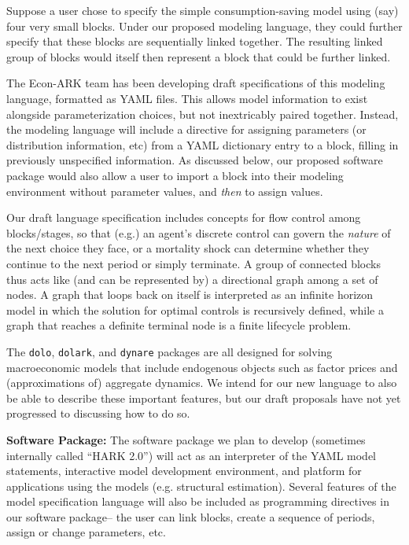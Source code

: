 \documentclass[12pt,pdftex,letterpaper]{article}
\begin{document}
Suppose a user chose to specify the simple consumption-saving model using (say) four very small blocks. Under our proposed modeling language, they could further specify that these blocks are sequentially linked together. The resulting linked group of blocks would itself then represent a block that could be further linked.

The Econ-ARK team has been developing draft specifications of this modeling language, formatted as YAML files. This allows model information to exist alongside parameterization choices, but not inextricably paired together. Instead, the modeling language will include a directive for assigning parameters (or distribution information, etc) from a YAML dictionary entry to a block, filling in previously unspecified information. As discussed below, our proposed software package would also allow a user to import a block into their modeling environment without parameter values, and \textit{then} to assign values.

Our draft language specification includes concepts for flow control among blocks/stages, so that (e.g.) an agent's discrete control can govern the \textit{nature} of the next choice they face, or a mortality shock can determine whether they continue to the next period or simply terminate. A group of connected blocks thus acts like (and can be represented by) a directional graph among a set of nodes. A graph that loops back on itself is interpreted as an infinite horizon model in which the solution for optimal controls is recursively defined, while a graph that reaches a definite terminal node is a finite lifecycle problem. 

The \texttt{dolo}, \texttt{dolark}, and \texttt{dynare} packages are all designed for solving macroeconomic models that include endogenous objects such as factor prices and (approximations of) aggregate dynamics. We intend for our new language to also be able to describe these important features, but our draft proposals have not yet progressed to  discussing how to do so.

\vspace{0.35cm}

\noindent \textbf{Software Package:} The software package we plan to develop (sometimes internally called ``HARK 2.0'') will act as an interpreter of the YAML model statements, interactive model development environment, and platform for applications using the models (e.g. structural estimation). Several features of the model specification language will also be included as programming directives in our software package-- the user can link blocks, create a sequence of periods, assign or change parameters, etc.
\end{document}

